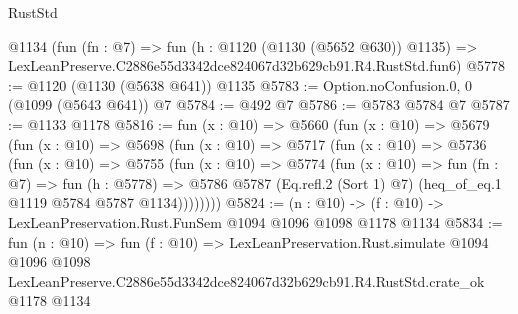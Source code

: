 \begin{lexlean}{RustStd}
\begin{coremodule}
    @1134
    (fun (fn : @7) =>
    fun (h : @1120 (@1130 (@5652 @630)) @1135) =>
    LexLeanPreserve.C2886e55d3342dce824067d32b629cb91.R4.RustStd.fun6)
@5778 := @1120 (@1130 (@5638 @641)) @1135
@5783 := Option.noConfusion.{0, 0} (@1099 (@5643 @641)) @7
@5784 := @492 @7
@5786 := @5783 @5784 @7
@5787 := @1133 @1178
@5816 := fun (x : @10) =>
  @5660
    (fun (x : @10) =>
    @5679
      (fun (x : @10) =>
      @5698
        (fun (x : @10) =>
        @5717
          (fun (x : @10) =>
          @5736
            (fun (x : @10) =>
            @5755
              (fun (x : @10) =>
              @5774
                (fun (x : @10) =>
                fun (fn : @7) =>
                fun (h : @5778) =>
                @5786 @5787 (Eq.refl.{2} (Sort 1) @7) (heq_of_eq.{1} @1119 @5784 @5787 @1134))))))))
@5824 := (n : @10) -> (f : @10) -> LexLeanPreservation.Rust.FunSem @1094 @1096 @1098 @1178 @1134
@5834 := fun (n : @10) =>
  fun (f : @10) =>
  LexLeanPreservation.Rust.simulate
    @1094
    @1096
    @1098
    LexLeanPreserve.C2886e55d3342dce824067d32b629cb91.R4.RustStd.crate_ok
    @1178
    @1134
\end{coremodule}
\end{lexlean}

